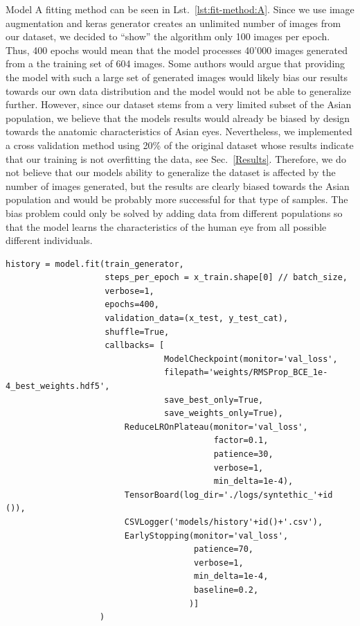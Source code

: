 \documentclass[12pt,a4paper]{scrartcl}
\begin{document}
Model A fitting method can be seen in Lst.~\ref{lst:fit-method:A}. Since we use image augmentation and keras generator creates an unlimited number of images from our dataset, we decided to ``show'' the algorithm only 100 images per epoch. Thus, 400 epochs would mean that the model processes 40'000 images generated from a the training set of 604 images. Some authors \cite{Shorten2019, mikolajcyk2018} would argue that providing the model with such a large set of generated images would likely bias our results towards our own data distribution and the model would not be able to generalize further. However, since our dataset stems from a very limited subset of the Asian population, we believe that the model\textquotesingle s results would already be biased by design towards the anatomic characteristics  of Asian eyes. Nevertheless, we implemented a cross validation method using 20\% of the original dataset whose results indicate that our training is not overfitting the data, see Sec.~\ref{Results}. Therefore, we do not believe that our model\textquotesingle s ability to generalize the dataset is affected by the number of images generated, but the results are clearly biased towards the Asian population and would be probably more successful for that type of samples. The bias problem could only be solved by adding data from different populations so that the model learns the characteristics of the human eye from all possible different individuals. 

\begin{lstlisting}[caption={Model A training parameters, this is a code snippet from the  \emph{train\_model\_A} method in \emph{train.py}}, label={lst:fit-method:A}]
history = model.fit(train_generator,
                    steps_per_epoch = x_train.shape[0] // batch_size,
                    verbose=1, 
                    epochs=400, 
                    validation_data=(x_test, y_test_cat),
                    shuffle=True,
                    callbacks= [
                                ModelCheckpoint(monitor='val_loss',
                                filepath='weights/RMSProp_BCE_1e-4_best_weights.hdf5',
                                save_best_only=True,
                                save_weights_only=True),
                        ReduceLROnPlateau(monitor='val_loss',
                                          factor=0.1,
                                          patience=30,
                                          verbose=1,
                                          min_delta=1e-4),
                        TensorBoard(log_dir='./logs/syntethic_'+id ()),
                        CSVLogger('models/history'+id()+'.csv'),
                        EarlyStopping(monitor='val_loss',
                                      patience=70,
                                      verbose=1,
                                      min_delta=1e-4,
                                      baseline=0.2,
                                     )]
                   )
\end{lstlisting}
\end{document}
